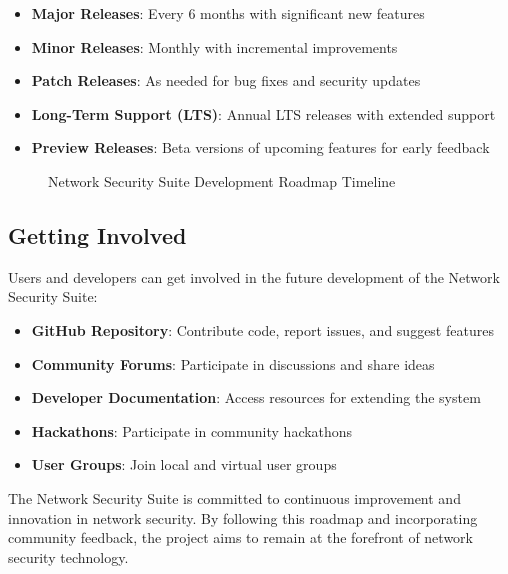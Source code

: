 \begin{itemize}
    \item \textbf{Major Releases}: Every 6 months with significant new features
    \item \textbf{Minor Releases}: Monthly with incremental improvements
    \item \textbf{Patch Releases}: As needed for bug fixes and security updates
    \item \textbf{Long-Term Support (LTS)}: Annual LTS releases with extended support
    \item \textbf{Preview Releases}: Beta versions of upcoming features for early feedback
\end{itemize}

\begin{figure}[H]
    \centering
    \caption{Network Security Suite Development Roadmap Timeline}
    \label{fig:roadmap}
\end{figure}

\subsection{Getting Involved}
Users and developers can get involved in the future development of the Network Security Suite:

\begin{itemize}
    \item \textbf{GitHub Repository}: Contribute code, report issues, and suggest features
    \item \textbf{Community Forums}: Participate in discussions and share ideas
    \item \textbf{Developer Documentation}: Access resources for extending the system
    \item \textbf{Hackathons}: Participate in community hackathons
    \item \textbf{User Groups}: Join local and virtual user groups
\end{itemize}

The Network Security Suite is committed to continuous improvement and innovation in network security. By following this roadmap and incorporating community feedback, the project aims to remain at the forefront of network security technology.